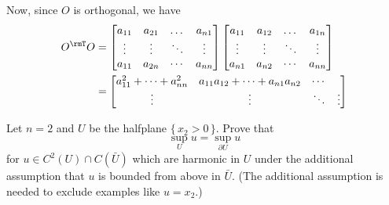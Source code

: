 \begin{solution}
  Now, since \(O\) is orthogonal, we have
  \begin{align*}
    O^\rmT O
    &=%
      \begin{bmatrix}
      a_{11}&a_{21}&\dotsc&a_{n1}\\
      \vdots&\vdots&\ddots&\vdots\\
      a_{11}&a_{2n}&\cdots&a_{nn}
      \end{bmatrix}
      \begin{bmatrix}
      a_{11}&a_{12}&\dotsc&a_{1n}\\
      \vdots&\vdots&\ddots&\vdots\\
      a_{n1}&a_{n2}&\cdots&a_{nn}
      \end{bmatrix}\\
    &=%
      \begin{bmatrix}
        a_{11}^2+\dotsb+a_{nn}^2&a_{11}a_{12}+\dotsb+a_{n1}a_{n2}&\cdots&\\
        \vdots&\vdots&\ddots&\vdots\\
      \end{bmatrix}
  \end{align*}
\end{solution}
\newpage

\begin{problem}
  Let \(n=2\) and \(U\) be the halfplane \(\{\,x_2>0\,\}\). Prove that
  \[
    \sup_U u=\sup_{\partial U}u
  \]
  for \(u\in C^2(U)\cap C(\bar U)\) which are harmonic in \(U\) under the
  additional assumption that \(u\) is bounded from above in \(\bar
  U\). (The additional assumption is needed to exclude examples like
  \(u=x_2\).)

\end{problem}
\begin{solution}
\end{solution}
\newpage


